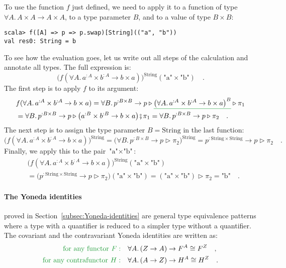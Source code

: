To use the function $f$ just defined, we need to apply it to a function
of type $\forall A.\,A\times A\rightarrow A\times A$, to a type parameter
$B$, and to a value of type $B\times B$:
\begin{lstlisting}
scala> f([A] => p => p.swap)[String](("a", "b"))
val res0: String = b
\end{lstlisting}
To see how the evaluation goes, let us write out all steps of the
calculation and annotate all types. The full expression is:
\[
\big(f(\forall A.\,a^{:A}\times b^{:A}\rightarrow b\times a)\big)^{\text{String}}(\text{"a"}\times\text{"b"})\quad.
\]
The first step is to apply $f$ to its argument:
\begin{align*}
 & f(\forall A.\,a^{:A}\times b^{:A}\rightarrow b\times a)=\forall B.\,p^{:B\times B}\rightarrow p\triangleright\gunderline{\big(\forall A.\,a^{:A}\times b^{:A}\rightarrow b\times a\big)^{B}}\triangleright\pi_{1}\\
 & =\forall B.\,p^{:B\times B}\rightarrow p\triangleright\big(a^{:B}\times b^{:B}\rightarrow b\times a\big)\bef\pi_{1}=\forall B.\,p^{:B\times B}\rightarrow p\triangleright\pi_{2}\quad.
\end{align*}
The next step is to assign the type parameter $B=\text{String}$ in
the last function:
\[
\big(f(\forall A.\,a^{:A}\times b^{:A}\rightarrow b\times a)\big)^{\text{String}}=\big(\forall B.\,p^{:B\times B}\rightarrow p\triangleright\pi_{2}\big)^{\text{String}}=p^{:\text{String}\times\text{String}}\rightarrow p\triangleright\pi_{2}\quad.
\]
Finally, we apply this to the pair $\text{"a"}\times\text{"b"}$:
\begin{align*}
 & \big(f(\forall A.\,a^{:A}\times b^{:A}\rightarrow b\times a)\big)^{\text{String}}(\text{"a"}\times\text{"b"})\\
 & =\big(p^{:\text{String}\times\text{String}}\rightarrow p\triangleright\pi_{2}\big)(\text{"a"}\times\text{"b"})=(\text{"a"}\times\text{"b"})\triangleright\pi_{2}=\text{"b"}\quad.
\end{align*}


\paragraph{The Yoneda identities}

proved in Section~\ref{subsec:Yoneda-identities} are general type
equivalence patterns where a type with a quantifier is reduced to
a simpler type without a quantifier. The covariant and the contravariant
Yoneda identities are written as:
\begin{align*}
{\color{greenunder}\text{for any functor }F:}\quad & \forall A.\,(Z\rightarrow A)\rightarrow F^{A}\cong F^{Z}\quad,\\
{\color{greenunder}\text{for any contrafunctor }H:}\quad & \forall A.\,(A\rightarrow Z)\rightarrow H^{A}\cong H^{Z}\quad.
\end{align*}

